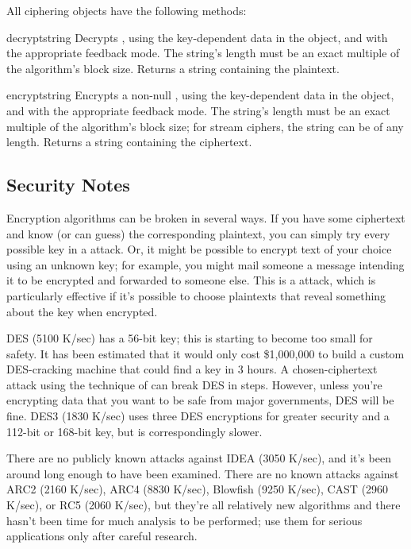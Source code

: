 \documentclass{howto}
\begin{document}
All ciphering objects have the following methods:

\begin{methoddesc}{decrypt}{string}
Decrypts , using the key-dependent data in the object, and
with the appropriate feedback mode.  The string's length must be an exact
multiple of the algorithm's block size.  Returns a string containing
the plaintext.
\end{methoddesc}

\begin{methoddesc}{encrypt}{string}
Encrypts a non-null , using the key-dependent data in the
object, and with the appropriate feedback mode.  The string's length
must be an exact multiple of the algorithm's block size; for stream
ciphers, the string can be of any length.  Returns a string containing
the ciphertext.
\end{methoddesc}


\subsection{Security Notes}
Encryption algorithms can be broken in several ways.  If you have some
ciphertext and know (or can guess) the corresponding plaintext, you can
simply try every possible key in a  attack.  Or, it
might be possible to encrypt text of your choice using an unknown key;
for example, you might mail someone a message intending it to be
encrypted and forwarded to someone else.  This is a
 attack, which is particularly effective if it's
possible to choose plaintexts that reveal something about the key when
encrypted.

DES (5100 K/sec) has a 56-bit key; this is starting to become too small
for safety.  It has been estimated that it would only cost \$1,000,000 to
build a custom DES-cracking machine that could find a key in 3 hours.  A
chosen-ciphertext attack using the technique of  can break DES in  steps.  However,
unless you're encrypting data that you want to be safe from major
governments, DES will be fine. DES3 (1830 K/sec) uses three DES
encryptions for greater security and a 112-bit or 168-bit key, but is
correspondingly slower.

There are no publicly known attacks against IDEA (3050 K/sec), and
it's been around long enough to have been examined.  There are no
known attacks against ARC2 (2160 K/sec), ARC4 (8830 K/sec), Blowfish
(9250 K/sec), CAST (2960 K/sec), or RC5 (2060 K/sec), but they're all
relatively new algorithms and there hasn't been time for much analysis
to be performed; use them for serious applications only after careful
research.
\end{document}
